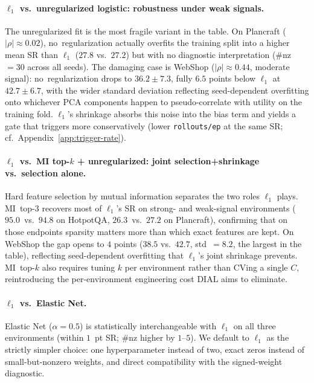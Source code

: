 \paragraph{$\ell_1$ vs.\ unregularized logistic: robustness under
weak signals.}
The unregularized fit is the most fragile variant in the table.
On Plancraft ($|\rho|{\approx}0.02$), no~regularization actually
overfits the training split into a higher mean SR than $\ell_1$
($27.8$ vs.\ $27.2$) but with no diagnostic interpretation
($\#$nz~$=30$ across all seeds). The damaging case is WebShop
($|\rho|{\approx}0.44$, moderate signal): no~regularization
drops to $36.2\pm7.3$, fully $6.5$ points below $\ell_1$ at
$42.7\pm6.7$, with the wider standard deviation reflecting
seed-dependent overfitting onto whichever PCA components happen
to pseudo-correlate with utility on the training fold.
$\ell_1$'s shrinkage absorbs this noise into the bias term and
yields a gate that triggers more conservatively (lower
\texttt{rollouts/ep} at the same SR; cf.\
Appendix~\ref{app:trigger-rate}).

\paragraph{$\ell_1$ vs.\ MI top-$k$ + unregularized: joint
selection+shrinkage vs.\ selection alone.}
Hard feature selection by mutual information separates the two
roles $\ell_1$ plays. MI~top-3 recovers most of $\ell_1$'s SR
on strong- and weak-signal environments ($95.0$~vs.\ $94.8$ on
HotpotQA, $26.3$~vs.\ $27.2$ on Plancraft), confirming that on
those endpoints sparsity matters more than which exact features
are kept. On WebShop the gap opens to $4$ points ($38.5$ vs.\
$42.7$, std~$=8.2$, the largest in the table), reflecting
seed-dependent overfitting that $\ell_1$'s joint shrinkage
prevents. MI~top-$k$ also requires tuning $k$ per environment
rather than CVing a single $C$, reintroducing the
per-environment engineering cost DIAL aims to eliminate.

\paragraph{$\ell_1$ vs.\ Elastic Net.}
Elastic Net ($\alpha{=}0.5$) is statistically interchangeable
with $\ell_1$ on all three environments (within $1$~pt SR;
$\#$nz higher by $1$--$5$). We default to $\ell_1$ as the
strictly simpler choice: one hyperparameter instead of two,
exact zeros instead of small-but-nonzero weights, and direct
compatibility with the signed-weight diagnostic.

